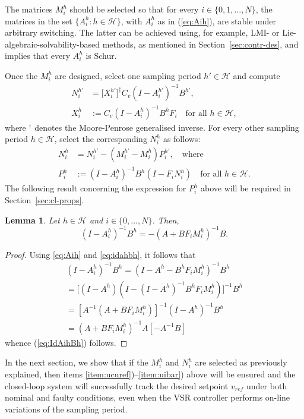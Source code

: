 \documentclass[letterpaper, 10 pt, conference]{ieeeconf}
\newcommand{\Hset}{\mathcal{H}}
\newtheorem{lem}{Lemma}
\begin{document}
The matrices $M_i^h$ should be selected so that for every $i \in
\{0,1,\ldots,N\}$, the matrices in the set $\{A_i^h : h \in \Hset\}$,
with $A_i^h$ as in (\ref{eq:Aih}), are stable under arbitrary
switching. The latter can be achieved using, for example, LMI- or
Lie-algebraic-solvability-based methods, as mentioned in
Section~\ref{sec:contr-des}, and implies that every $A_i^h$ is Schur.


Once the $M_i^h$ are designed, select one sampling period $h'\in\Hset$
and compute
\begin{align}
  \label{eq:firstnih}
  N_i^{h'} &= \big[X_i^{h'}\big]^\dagger C_v(I-A_i^{h'})^{-1}B^{h'}, \\
  \label{eq:Xih}
  X_i^h &:= C_v(I-A_i^{h})^{-1}B^{h}F_i\quad\text{for all }h\in\Hset,
\end{align}
where $^\dagger$ denotes the Moore-Penrose generalised inverse. For
every other sampling period $h\in\Hset$, select the corresponding
$N_i^h$ as follows:
\begin{align}
  \label{eq:Nselect}
  N_i^h &= N_i^{h'} - (M_i^{h'} - M_i^{h}) P_i^{h'},\quad \text{where}\\
  \label{eq:Pi}
  P_i^h &:= (I-A_i^h)^{-1}B^h(I-F_i N_i^h)\quad\text{for all }h\in\Hset.
\end{align}
The following result concerning the expression for $P_i^h$ above will
be required in Section~\ref{sec:cl-props}.
\begin{lem}
  \label{lem:imAihBh}
  Let $h\in\Hset$ and $i\in\{0,\ldots,N\}$. Then,
  \begin{equation}
    \label{eq:IdAihBh}  
    (I-A_i^{h})^{-1}B^{h}= -(A+BF_iM_i^{h})^{-1}B. 
  \end{equation}
\end{lem}
\begin{proof}
  Using \eqref{eq:Aih} and \eqref{eq:idahbh}, it follows that
\begin{align*}
    (I-A_i^{h})^{-1}B^{h} =(I-A^{h}-B^{h}F_iM_i^{h})^{-1}B^{h}\\
    =\big[(I-A^{h})(I-(I-A^{h})^{-1}B^{h}F_iM_i^{h})\big]^{-1}B^{h} \\
    =[A^{-1}(A+BF_iM_i^{h})]^{-1}(I-A^{h})^{-1}B^{h}\\
    =(A+BF_iM_i^{h})^{-1}A[-A^{-1}B]
  \end{align*}
  whence (\ref{eq:IdAihBh}) follows.
\end{proof}

In the next section, we show that if the $M_i^h$ and $N_i^h$ are
selected as previously explained, then items
\ref{item:ucuref})--\ref{item:uibar}) above will be ensured and the
closed-loop system will successfully track the desired setpoint
$v_{ref}$ under both nominal and faulty conditions, even when the VSR
controller performs on-line variations of the sampling period.
\end{document}
